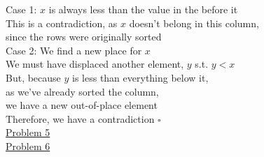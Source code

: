 \documentclass[12pt]{article}
\begin{document}
\indent\indent\indent Case 1: $x$ is always less than the value in the before it\\
\indent\indent\indent\indent This is a contradiction, as $x$ doesn't belong in this column,\\
\indent\indent\indent\indent since the rows were originally sorted\\
\indent\indent\indent Case 2: We find a new place for $x$\\
\indent\indent\indent\indent We must have displaced another element, $y$ s.t. $y < x$\\
\indent\indent\indent\indent But, because $y$ is less than everything below it,\\ 
\indent\indent\indent\indent\indent as we've already sorted the column,\\ 
\indent\indent\indent\indent\indent we have a new out-of-place element\\
\indent\indent\indent\indent Therefore, we have a contradiction $\square$\\
\underline{Problem 5}\\
\underline{Problem 6}\\
\end{document}
